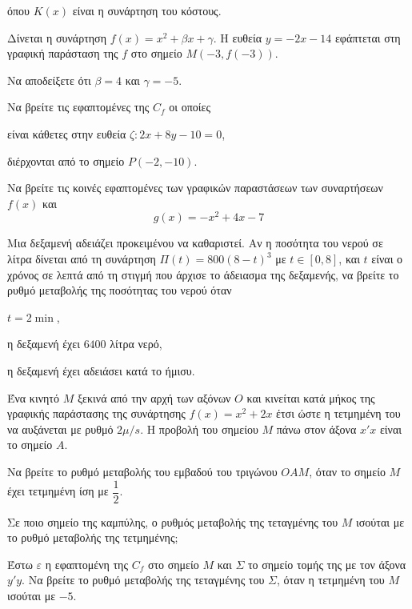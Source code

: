 \documentclass[ektypwsh]{frontisthrio-diag}
\begin{document}
\begin{thema}
\begin{erwthma}
\begin{alist}
όπου $ K(x) $ είναι η συνάρτηση του κόστους.
\end{alist}
\end{erwthma}
\item Δίνεται η συνάρτηση $ f(x)=x^2+\beta x+\gamma $. Η ευθεία $ y=-2x-14 $ εφάπτεται στη γραφική παράσταση της $ f $ στο σημείο $ M(-3,f(-3)) $.
\begin{erwthma}
\item Να αποδείξετε ότι $ \beta=4 $ και $ \gamma=-5 $.
\item Να βρείτε τις εφαπτομένες της $ C_f $ οι οποίες
\begin{alist}
\item είναι κάθετες στην ευθεία $ \zeta: 2x+8y-10=0 $,
\item διέρχονται από το σημείο $ P(-2,-10) $.
\end{alist}
\item Να βρείτε τις κοινές εφαπτομένες των γραφικών παραστάσεων των συναρτήσεων $ f(x) $ και 
\[ g(x)=-x^2+4x-7 \]
\end{erwthma}
\item Μια δεξαμενή αδειάζει προκειμένου να καθαριστεί. Αν η ποσότητα του νερού σε λίτρα δίνεται από τη συνάρτηση $ \Pi(t)=800(8-t)^3 $ με $ t\in[0,8] $, και $ t $ είναι ο χρόνος σε λεπτά από τη στιγμή που άρχισε το άδειασμα της δεξαμενής, να βρείτε το ρυθμό μεταβολής της ποσότητας του νερού όταν
\begin{erwthma}
\item $ t=2\min $,
\item η δεξαμενή έχει $ 6400 $ λίτρα νερό,
\item η δεξαμενή έχει αδειάσει κατά το ήμισυ.
\end{erwthma}
\item Ένα κινητό $ M $ ξεκινά από την αρχή των αξόνων $ O $ και κινείται κατά μήκος της γραφικής παράστασης της συνάρτησης $ f(x)=x^2+2x $ έτσι ώστε η τετμημένη του να αυξάνεται με ρυθμό $ 2\mu/s $. Η προβολή του σημείου $ M $ πάνω στον άξονα $ x'x $ είναι το σημείο $ A $.
\begin{erwthma}
\item Να βρείτε το ρυθμό μεταβολής του εμβαδού του τριγώνου $ OAM $, όταν το σημείο $ M $ έχει τετμημένη ίση με $ \dfrac{1}{2} $.
\item Σε ποιο σημείο της καμπύλης, ο ρυθμός μεταβολής της τεταγμένης του $ M $ ισούται με το ρυθμό μεταβολής της τετμημένης;
\item Έστω $ \varepsilon $ η εφαπτομένη της $ C_f $ στο σημείο $ M $ και $ \Sigma $ το σημείο τομής της με τον άξονα $ y'y $. Να βρείτε το ρυθμό μεταβολής της τεταγμένης του $ \Sigma $, όταν η τετμημένη του $ M $ ισούται με $ -5 $.
\end{erwthma}
\end{thema}
\kaliepityxia
\end{document}
